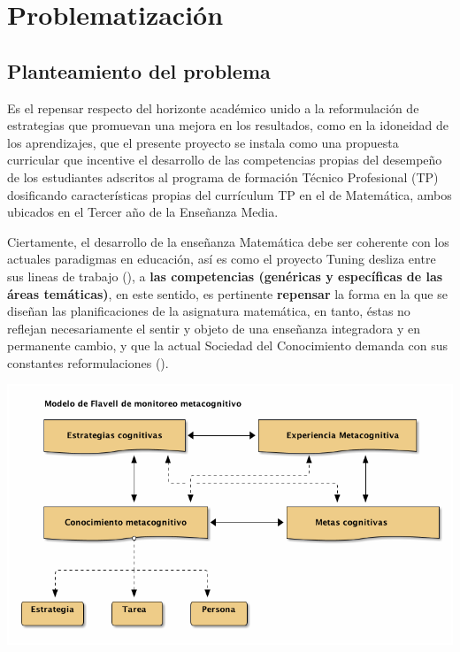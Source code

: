 \documentclass[12pt,letterpaper,article,x11names]{memoir}
\begin{document}
\setcounter{tocdepth}{3}
\tableofcontents

\chapter{Problematización}
\label{sec:org0610d0d}
\section{Planteamiento del problema}
\label{sec:org86d995b}
Es el repensar respecto del horizonte académico unido a la reformulación de estrategias que promuevan una mejora en los resultados, como en la idoneidad de los aprendizajes, que el presente proyecto se instala como una propuesta curricular que incentive el desarrollo de las competencias propias del desempeño de los estudiantes adscritos al programa de formación Técnico Profesional (TP) dosificando características propias del currículum TP en el de Matemática, ambos ubicados en el Tercer año de la Enseñanza Media.

Ciertamente, el desarrollo de la enseñanza Matemática debe ser coherente con los actuales paradigmas en educación, así es como el proyecto Tuning desliza entre sus lineas de trabajo (\citeauthor{gonzalez2004contribucion}), a \textbf{las competencias (genéricas y específicas de las áreas temáticas)}, en este sentido, es pertinente \textbf{repensar} la forma en la que se diseñan las planificaciones de la asignatura matemática, en tanto, éstas no reflejan necesariamente el sentir y objeto de una enseñanza integradora y en permanente cambio, y que la actual Sociedad del Conocimiento demanda con sus constantes reformulaciones (\citeauthor{gonzalez2004contribucion}).

\begin{center}
\includegraphics[width=.9\linewidth]{images/flavell.png}
\end{center}
\end{document}
